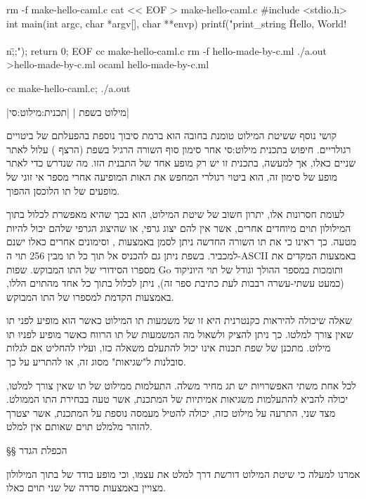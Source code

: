 \bash
rm -f make-hello-caml.c
cat << EOF > make-hello-caml.c
#include <stdio.h>
int main(int argc, char *argv[], char **envp) {
  printf("print_string \"Hello, World!\\\\n\";;\n");
  return 0;
}
EOF
cc make-hello-caml.c
rm -f hello-made-by-c.ml
./a.out >hello-made-by-c.ml
ocaml hello-made-by-c.ml
\END

{
\setLTR

}

\bash
cc make-hello-caml.c; ./a.out
\END
\begin{תכנית}
\bashStdout
{}|מילוט בשפת |
|תכנית:מילוט:סי|
\end{תכנית}

קושי נוסף ששיטת המילוט טומנת בחובה הוא ברמת סיבוך נוספת בהפעלתם של ביטויים
רגולריים. חיפוש ב תכנית מילוט:סי אחר סימון סוף השורה הרגיל בשפת  (הרצף
{\let\ttfamily=\listingsfont\RL{\verb+\n+}}) עלול לאתר שניים כאלו, אך למעשה,
בתכנית זו יש רק מופע אחד של התבנית הזו. מה שנדרש כדי לאתר מופע של סימון זה,
הוא ביטוי רגולרי המחפש את האות  המופיעה אחרי מספר אי זוגי של מופעים של
תו הלוכסן ההפוך.

לעומת חסרונות אלו, יתרון חשוב של שיטת המילוט, הוא בכך שהיא מאפשרת לכלול
בתוך המילולון תוים מיוחדים אחרים, אשר אין להם יצוג גרפי, או שהיצוג הגרפי
שלהם יכול להיות מטעה. כך ראינו כי את תו השורה החדשה ניתן לסמן באמצעות
{\let\ttfamily=\listingsfont\RL{\verb+\n+}},
וסימונים אחרים כאלו
ישנם למכביר. בשפת  ניתן גם להכניס אל תוך  כל תו מבין 256 תוי
ה-ASCII באמצעות  המקדים את מספרו הסידורי של התו המבוקש. שפות
Go ו תומכות במספר ההולך וגודל של תוי היוניקוד (כמעט עשתי-עשרה רבבות לעת
כתיבת ספר זה), ניתן לכלול בתוך   כל אחד מהתוים הללו, באמצעות
הקדמת  למספרו של התו המבוקש.

שאלה שיכולה להיראות כקנטרנית היא זו של משמעות תו המילוט כאשר הוא מופיע לפני תו
שאין צורך למלטו. כך ניתן להציק ולשאול מה המשמעות של תו הרווח כאשר מופיע לפניו
תו מילוט. מתכנן של שפת תכנות אינו יכול להתעלם משאלה כזו, ועליו להחליט אם לגלות
סובלנות ל"שגיאות" מסוג זה, או להתריע על כך.

לכל אחת משתי האפשרויות יש תג מחיר משלה. התעלמות ממילוט של תו שאין צורך למלטו,
יכולה להביא להתעלמות משגיאות אמיתיות של המתכנת, אשר טעה בבחירת התו הממולט. מצד
שני, התרעה על מילוט כזה, יכולה להטיל מעמסה נוספת על המתכנת, אשר יצטרך להזהר
מלמלט תוים שאותם אין למלט.

§§ הכפלת הגדר

אמרנו למעלה כי שיטת המילוט דורשת דרך למלט את  עצמו,
וכי מופע בודד של  בתוך המילולון מצויין באמצעות סדרה של
שני תוים כאלו.


